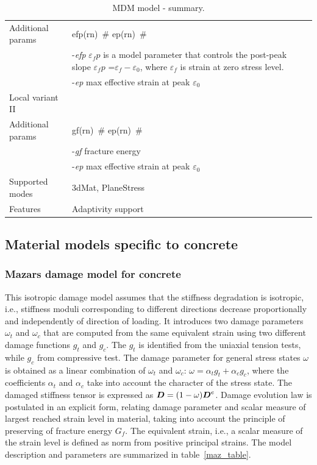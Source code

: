 \documentclass[a4paper]{article}
\newcommand{\mbf}[1]{\mbox{\boldmath$#1$}}
\newcommand{\elemparam}[2]{{{#1\tiny (#2)}~\#}}
\newcommand{\param}[1]{{\it #1}}
\begin{document}
\begin{table}[!htb]
\begin{tabular}{|l|p{9cm}|}
Additional params &\elemparam{efp}{rn} \elemparam{ep}{rn}\\
& -\param{efp} $\varepsilon_fp$ is a model parameter that controls
the post-peak slope $\varepsilon_fp$ =$\varepsilon_f-\varepsilon_0$,
where $\varepsilon_f$ is strain at zero stress level.\\
& -\param{ep} max effective strain at peak $\varepsilon_0$\\
\hline
Local variant II&\\
Additional params &\elemparam{gf}{rn} \elemparam{ep}{rn}\\
& -\param{gf} fracture energy\\
& -\param{ep} max effective strain at peak $\varepsilon_0$\\
\hline
Supported modes& 3dMat, PlaneStress\\
Features & Adaptivity support\\
\hline
\end{tabular}
\caption{MDM model - summary.}
\label{mdm_table}
\end{table}

\clearpage

\subsection{Material models specific to concrete}
\subsubsection{Mazars damage model for concrete}
This isotropic damage model assumes that the stiffness degradation is
isotropic, i.e., stiffness moduli corresponding to different
directions decrease proportionally and independently of direction of
loading.
It introduces two damage parameters $\omega_t$ and $\omega_c$ that
are computed from the same equivalent strain using two different damage functions
$g_t$ and $g_c$. The $g_t$ is identified from the uniaxial tension tests, while
$g_c$ from compressive test. The damage parameter for general stress states
$\omega$ is obtained as a linear combination of $\omega_t$ and $\omega_c$:
$\omega=\alpha_t g_t + \alpha_c g_c$, where the coefficients
$\alpha_t$ and $\alpha_c$ take into account the character of the
stress state.
The damaged stiffness tensor is expressed as
$\mbf{D}=(1-\omega)\mbf{D}^e$.
Damage evolution law is postulated in an explicit form, relating
damage parameter and scalar measure of largest reached strain level in
material, taking into account the principle of preserving of fracture
energy $G_f$. The equivalent strain, i.e., a scalar measure of the
strain level is defined as norm from positive principal strains.
The model description and parameters are summarized
in table~\ref{maz_table}.
\end{document}
